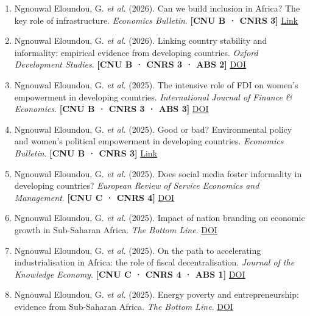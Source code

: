 \documentclass[
  french,
  10pt,
  letterpaper,
  DIV=11,
  numbers=noendperiod]{scrartcl}
\newcommand{\rank}[1]{{\small\color{accent}\textbf{[#1]}}}
\begin{document}
\begin{enumerate}[leftmargin=1.6em, itemsep=3pt]

\item Ngnouwal Eloundou, G. \textit{et al.} (2026). Can we build inclusion in Africa? The key role of infrastructure. \textit{Economics Bulletin}. \rank{CNU B · CNRS 3} \href{http://www.accessecon.com/Pubs/EB/2026/Volume46/EB-26-V46-I1-P1.pdf}{Link}

\item Ngnouwal Eloundou, G. \textit{et al.} (2026). Linking country stability and informality: empirical evidence from developing countries. \textit{Oxford Development Studies}. \rank{CNU B · CNRS 3 · ABS 2} \href{https://doi.org/10.1080/13600818.2026.2654469}{DOI}

\item Ngnouwal Eloundou, G. \textit{et al.} (2025). The intensive role of FDI on women's empowerment in developing countries. \textit{International Journal of Finance \& Economics}. \rank{CNU B · CNRS 3 · ABS 3} \href{https://doi.org/10.1002/ijfe.70097}{DOI}

\item Ngnouwal Eloundou, G. \textit{et al.} (2025). Good or bad? Environmental policy and women's political empowerment in developing countries. \textit{Economics Bulletin}. \rank{CNU B · CNRS 3} \href{https://econpapers.repec.org/article/eblecbull/eb-23-00209.htm}{Link}

\item Ngnouwal Eloundou, G. \textit{et al.} (2025). Does social media foster informality in developing countries? \textit{European Review of Service Economics and Management}. \rank{CNU C · CNRS 4} \href{https://doi.org/10.48611/isbn.978-2-406-18573-4.p.0071}{DOI}

\item Ngnouwal Eloundou, G. \textit{et al.} (2025). Impact of nation branding on economic growth in Sub-Saharan Africa. \textit{The Bottom Line}. \href{https://doi.org/10.1108/BL-07-2024-0088}{DOI}

\item Ngnouwal Eloundou, G. \textit{et al.} (2025). On the path to accelerating industrialisation in Africa: the role of fiscal decentralisation. \textit{Journal of the Knowledge Economy}. \rank{CNU C · CNRS 4 · ABS 1} \href{https://doi.org/10.1007/s13132-025-02602-2}{DOI}

\item Ngnouwal Eloundou, G. \textit{et al.} (2025). Energy poverty and entrepreneurship: evidence from Sub-Saharan Africa. \textit{The Bottom Line}. \href{https://doi.org/10.1108/BL-09-2024-0169}{DOI}


\end{enumerate}
\end{document}
